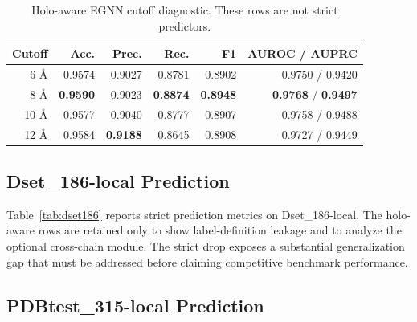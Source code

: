 \documentclass[runningheads]{llncs}
\begin{document}
\begin{table}[t]
\centering
\caption{Holo-aware EGNN cutoff diagnostic. These rows are not strict predictors.}
\label{tab:cutoff}
\begin{tabular}{rrrrrr}
\toprule
Cutoff & Acc. & Prec. & Rec. & F1 & AUROC / AUPRC \\
\midrule
6 \AA{}  & 0.9574 & 0.9027 & 0.8781 & 0.8902 & 0.9750 / 0.9420 \\
8 \AA{}  & \textbf{0.9590} & 0.9023 & \textbf{0.8874} & \textbf{0.8948} & \textbf{0.9768} / \textbf{0.9497} \\
10 \AA{} & 0.9577 & 0.9040 & 0.8777 & 0.8907 & 0.9758 / 0.9488 \\
12 \AA{} & 0.9584 & \textbf{0.9188} & 0.8645 & 0.8908 & 0.9727 / 0.9449 \\
\bottomrule
\end{tabular}
\end{table}

\subsection{Dset\_186-local Prediction}

Table~\ref{tab:dset186} reports strict prediction metrics on Dset\_186-local. The
holo-aware rows are retained only to show label-definition leakage and to analyze the
optional cross-chain module. The strict drop exposes a substantial generalization gap
that must be addressed before claiming competitive benchmark performance.

\begin{table}[t]
\centering
\caption{External prediction on Dset\_186-local (158 complexes, 39,505 residues).}
\label{tab:dset186}
\end{table}

\subsection{PDBtest\_315-local Prediction}
\end{document}
